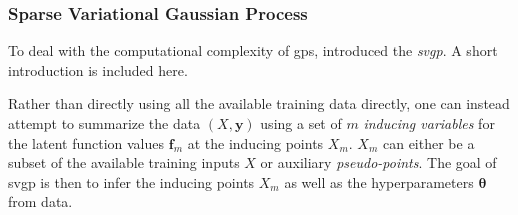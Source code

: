 \subsubsection{Sparse Variational Gaussian Process}
To deal with the computational complexity of \acrshort{gp}s, \cite{Titsias2008VariationalMS} introduced the \textit{\acrfull{svgp}}. A short introduction is included here. 

Rather than directly using all the available training data directly, one can instead attempt to summarize the data $(X, \boldsymbol{y})$ using a set of $m$ \textit{inducing variables} for the latent function values $\boldsymbol{f}_m$ at the inducing points $X_m$. $X_m$ can either be a subset of the available training inputs $X$ or auxiliary \textit{pseudo-points}. The goal of \acrshort{svgp} is then to infer the inducing points $X_m$ as well as the hyperparameters $\boldsymbol{\theta}$ from data. 



\subsubsection{}
